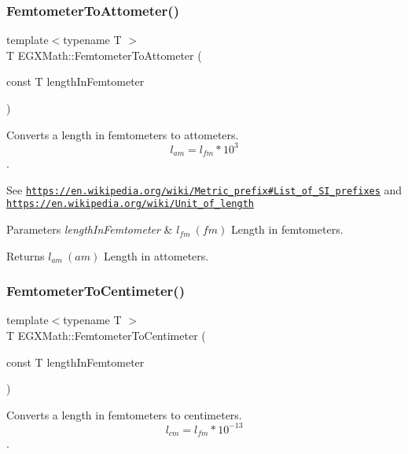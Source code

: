 \subsubsection{\texorpdfstring{Femtometer\+To\+Attometer()}{FemtometerToAttometer()}}
{\footnotesize\ttfamily template$<$typename T $>$ \\
T E\+G\+X\+Math\+::\+Femtometer\+To\+Attometer (\begin{DoxyParamCaption}\item[{const T}]{length\+In\+Femtometer }\end{DoxyParamCaption})}



Converts a length in femtometers to attometers. \[ l_{am}=l_{fm} * 10^{3} \]. 

See \href{https://en.wikipedia.org/wiki/Metric_prefix#List_of_SI_prefixes}{\tt https\+://en.\+wikipedia.\+org/wiki/\+Metric\+\_\+prefix\#\+List\+\_\+of\+\_\+\+S\+I\+\_\+prefixes} and \href{https://en.wikipedia.org/wiki/Unit_of_length}{\tt https\+://en.\+wikipedia.\+org/wiki/\+Unit\+\_\+of\+\_\+length} 
\begin{DoxyParams}{Parameters}
{\em length\+In\+Femtometer} & $ l_{fm}\ (fm)$ Length in femtometers. \\
\hline
\end{DoxyParams}
\begin{DoxyReturn}{Returns}
$ l_{am}\ (am)$ Length in attometers. 
\end{DoxyReturn}
\mbox{\label{group___e_g_x_math-_conversions-_length_conversions-_s_i-_femtometer-_s_i_ga9a7e58a22b438341f8fffc8d78dd8483}} 
\subsubsection{\texorpdfstring{Femtometer\+To\+Centimeter()}{FemtometerToCentimeter()}}
{\footnotesize\ttfamily template$<$typename T $>$ \\
T E\+G\+X\+Math\+::\+Femtometer\+To\+Centimeter (\begin{DoxyParamCaption}\item[{const T}]{length\+In\+Femtometer }\end{DoxyParamCaption})}



Converts a length in femtometers to centimeters. \[ l_{cm}=l_{fm} * 10^{-13} \]. 

